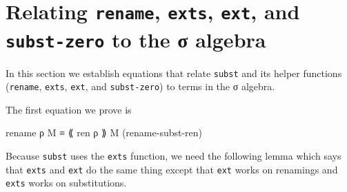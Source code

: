 \hypertarget{relating-rename-exts-ext-and-subst-zero-to-the-ux3c3-algebra}{%
\section{\texorpdfstring{Relating \texttt{rename}, \texttt{exts},
\texttt{ext}, and \texttt{subst-zero} to the σ
algebra}{Relating rename, exts, ext, and subst-zero to the σ algebra}}\label{relating-rename-exts-ext-and-subst-zero-to-the-ux3c3-algebra}}

In this section we establish equations that relate \texttt{subst} and
its helper functions (\texttt{rename}, \texttt{exts}, \texttt{ext}, and
\texttt{subst-zero}) to terms in the σ algebra.

The first equation we prove is

\begin{myDisplay}
rename ρ M ≡ ⟪ ren ρ ⟫ M              (rename-subst-ren)
\end{myDisplay}

Because \texttt{subst} uses the \texttt{exts} function, we need the
following lemma which says that \texttt{exts} and \texttt{ext} do the
same thing except that \texttt{ext} works on renamings and \texttt{exts}
works on substitutions.

